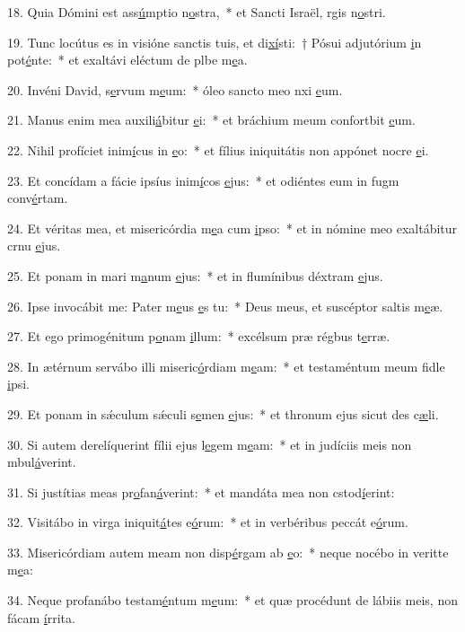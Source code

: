 18. Quia Dómini est ass\uline{ú}mptio n\uline{o}stra,~* et Sancti Israël, rgis n\uline{o}stri.\par 
19. Tunc locútus es in visióne sanctis tuis, et di\uline{xí}sti:~† Pósui adjutórium \uline{i}n pot\uline{é}nte:~* et exaltávi eléctum de plbe m\uline{e}a.\par 
20. Invéni David, s\uline{e}rvum m\uline{e}um:~* óleo sancto meo nxi \uline{e}um.\par 
21. Manus enim mea auxili\uline{á}bitur \uline{e}i:~* et bráchium meum confortbit \uline{e}um.\par 
22. Nihil profíciet inim\uline{í}cus in \uline{e}o:~* et fílius iniquitátis non appónet nocre \uline{e}i.\par 
23. Et concídam a fácie ipsíus inim\uline{í}cos \uline{e}jus:~* et odiéntes eum in fugm conv\uline{é}rtam.\par 
24. Et véritas mea, et misericórdia m\uline{e}a cum \uline{i}pso:~* et in nómine meo exaltábitur crnu \uline{e}jus.\par 
25. Et ponam in mari m\uline{a}num \uline{e}jus:~* et in flumínibus déxtram \uline{e}jus.\par 
26. Ipse invocábit me: Pater m\uline{e}us \uline{e}s tu:~* Deus meus, et suscéptor saltis m\uline{e}æ.\par 
27. Et ego primogénitum p\uline{o}nam \uline{i}llum:~* excélsum præ régbus t\uline{e}rræ.\par 
28. In ætérnum servábo illi miseric\uline{ó}rdiam m\uline{e}am:~* et testaméntum meum fidle \uline{i}psi.\par 
29. Et ponam in sǽculum sǽculi s\uline{e}men \uline{e}jus:~* et thronum ejus sicut des c\uline{æ}li.\par 
30. Si autem derelíquerint fílii ejus l\uline{e}gem m\uline{e}am:~* et in judíciis meis non mbul\uline{á}verint.\par 
31. Si justítias meas pr\uline{o}fan\uline{á}verint:~* et mandáta mea non cstod\uline{í}erint:\par 
32. Visitábo in virga iniquit\uline{á}tes e\uline{ó}rum:~* et in verbéribus peccát e\uline{ó}rum.\par 
33. Misericórdiam autem meam non disp\uline{é}rgam ab \uline{e}o:~* neque nocébo in veritte m\uline{e}a:\par 
34. Neque profanábo testam\uline{é}ntum m\uline{e}um:~* et quæ procédunt de lábiis meis, non fácam \uline{í}rrita.\par 
